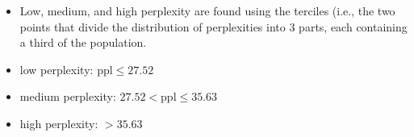 
\begin{itemize}
    \item Low, medium, and high perplexity are found using the terciles (i.e., the two points that divide the distribution of perplexities into 3 parts, each containing a third of the population.
    \item low perplexity: $\text{ppl}\leq27.52$
    \item medium perplexity: $27.52 < \text{ppl} \leq 35.63$
    \item high perplexity: $>35.63$
\end{itemize}


